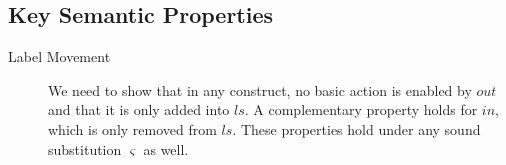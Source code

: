 

\newpage
\subsection{Key Semantic Properties}

\begin{description}
  \item[Label Movement]
    We need to show that in any construct,
    no basic action is enabled by $out$
    and that it is only added into $ls$.
    A complementary property holds for $in$,
    which is only removed from $ls$.
    These properties hold under any sound substitution $\varsigma$ as well.
\end{description}
